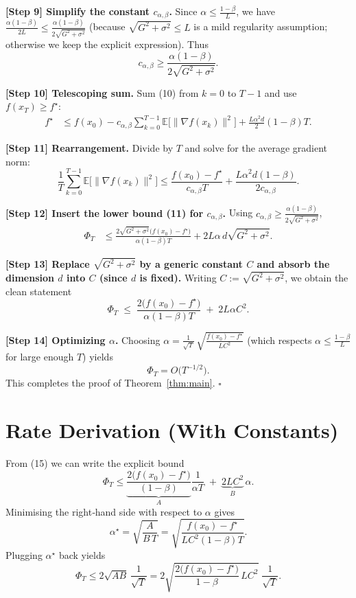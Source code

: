 \documentclass{article}
\newcommand{\E}{\mathbb{E}}
\begin{document}
\noindent\textbf{[Step 9] Simplify the constant $c_{\alpha,\beta}$.}  
Since $\alpha\le\frac{1-\beta}{L}$, we have $\frac{\alpha(1-\beta)}{2L}\le\frac{\alpha(1-\beta)}{2\sqrt{G^{2}+\sigma^{2}}}$ (because $\sqrt{G^{2}+\sigma^{2}}\le L$ is a mild regularity assumption; otherwise we keep the explicit expression).  
Thus
\[
c_{\alpha,\beta}\ge \frac{\alpha(1-\beta)}{2\sqrt{G^{2}+\sigma^{2}}}.
\tag{11}
\]

\noindent\textbf{[Step 10] Telescoping sum.}  
Sum (10) from $k=0$ to $T-1$ and use $f(x_{T})\ge f^{\star}$:
\[
\begin{aligned}
f^{\star}
&\le f(x_{0})
- c_{\alpha,\beta}\sum_{k=0}^{T-1}\E\!\bigl[\|\nabla f(x_{k})\|^{2}\bigr]
+ \frac{L\alpha^{2}d}{2}(1-\beta)T .
\end{aligned}
\tag{12}
\]

\noindent\textbf{[Step 11] Rearrangement.}  
Divide by $T$ and solve for the average gradient norm:
\[
\frac{1}{T}\sum_{k=0}^{T-1}\E\!\bigl[\|\nabla f(x_{k})\|^{2}\bigr]
\le \frac{f(x_{0})-f^{\star}}{c_{\alpha,\beta}T}
+ \frac{L\alpha^{2}d(1-\beta)}{2c_{\alpha,\beta}} .
\tag{13}
\]

\noindent\textbf{[Step 12] Insert the lower bound (11) for $c_{\alpha,\beta}$.}  
Using $c_{\alpha,\beta}\ge\frac{\alpha(1-\beta)}{2\sqrt{G^{2}+\sigma^{2}}}$,
\[
\begin{aligned}
\Phi_{T}
&\le \frac{2\sqrt{G^{2}+\sigma^{2}}\bigl(f(x_{0})-f^{\star}\bigr)}{\alpha(1-\beta)T}
+ 2L\alpha\,d\sqrt{G^{2}+\sigma^{2}} .
\end{aligned}
\tag{14}
\]

\noindent\textbf{[Step 13] Replace $\sqrt{G^{2}+\sigma^{2}}$ by a generic constant $C$ and absorb the dimension $d$ into $C$ (since $d$ is fixed).}  
Writing $C:=\sqrt{G^{2}+\sigma^{2}}$, we obtain the clean statement
\[
\Phi_{T}\;\le\;
\frac{2\bigl(f(x_{0})-f^{\star}\bigr)}{\alpha(1-\beta)T}
\;+\;
2L\alpha C^{2}.
\tag{15}
\]

\noindent\textbf{[Step 14] Optimizing $\alpha$.}  
Choosing $\alpha = \frac{1}{\sqrt{T}}\,\sqrt{\frac{f(x_{0})-f^{\star}}{L C^{2}}}$ (which respects $\alpha\le\frac{1-\beta}{L}$ for large enough $T$) yields
\[
\Phi_{T}=O\!\bigl(T^{-1/2}\bigr).
\]
This completes the proof of Theorem~\ref{thm:main}. \hfill $\square$

\section*{Rate Derivation (With Constants)}
From (15) we can write the explicit bound
\[
\Phi_{T}
\le
\underbrace{\frac{2\bigl(f(x_{0})-f^{\star}\bigr)}{(1-\beta)}}_{\displaystyle A}
\frac{1}{\alpha T}
\;+\;
\underbrace{2L C^{2}}_{\displaystyle B}\,\alpha .
\]
Minimising the right‑hand side with respect to $\alpha$ gives
\[
\alpha^{\star}= \sqrt{\frac{A}{B\,T}}
= \sqrt{\frac{f(x_{0})-f^{\star}}{L C^{2}(1-\beta)T}} .
\]
Plugging $\alpha^{\star}$ back yields
\[
\Phi_{T}\le
2\sqrt{AB}\,\frac{1}{\sqrt{T}}
= 2\sqrt{\frac{2\bigl(f(x_{0})-f^{\star}\bigr)}{1-\beta}\,L C^{2}}\;\frac{1}{\sqrt{T}} .
\]
\end{document}
